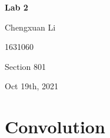 \documentclass{article}
\begin{document}
\begin{titlepage}
\begin{center}
\vspace*{1cm}
		
\textbf{Lab 2}
			
\vspace{0.5cm}
Chengxuan Li
			
\vspace{0.1cm}
1631060
			
\vspace{0.1cm}
Section 801
			
\vspace{0.1cm}
Oct 19th, 2021
\end{center}
\end{titlepage}

\section{Convolution}
\end{document}
